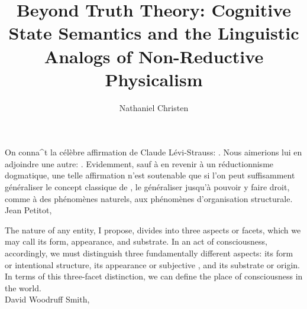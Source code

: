 \documentclass[11pt,twocolumn]{article}
\begin{document}
\title{Beyond Truth Theory: Cognitive State Semantics and the 
Linguistic Analogs of Non-Reductive Physicalism}
\author{Nathaniel Christen}
\newsavebox{\qboxi}
\newsavebox{\qboxii}
\begin{lrbox}{\qboxi}
\begin{frquote}On conna\^{\OldI}t la c\'{e}l\`{e}bre affirmation de Claude L\'{e}vi-Strauss: 
.  Nous aimerions lui en
adjoindre une autre: . 
Evidemment, sauf \`{a} en revenir \`{a} un r\'{e}ductionnisme dogmatique, une telle
affirmation n'est soutenable que si l'on peut suffisamment g\'{e}n\'{e}raliser le concept
classique de , le g\'{e}n\'{e}raliser jusqu'\`{a} pouvoir y faire droit, 
comme \`{a} des ph\'{e}nom\`{e}nes naturels, aux ph\'{e}nom\`{e}nes d'organisation structurale.
\\ \longdash{} Jean Petitot, \cite[p. 1]{PetitotSyntaxe}
\end{frquote}
\end{lrbox}	
\begin{lrbox}{\qboxii}
\begin{frquote}The nature of any entity, I propose, divides into three aspects or facets, which we may call its
	form, appearance, and substrate.  In an act of consciousness, accordingly, we must distinguish
	three fundamentally different aspects: its form or intentional structure, its appearance or
	subjective , and its substrate or origin.  In terms of this three-facet distinction, 
	we can define the place of consciousness in the world.
\\ \longdash{} David Woodruff Smith, \cite[p. 11]{DavidWoodruffSmith}
\end{frquote}
\end{lrbox}	
\twocolumn[\begin{@twocolumnfalse}
\maketitle{}
\begin{abstract}\end{abstract}
\begin{flushright}\usebox{\qboxi}
\usebox{\qboxii}
\end{flushright}
\decoline{}
\vspace{3em}
\end{@twocolumnfalse}]














\end{document}
